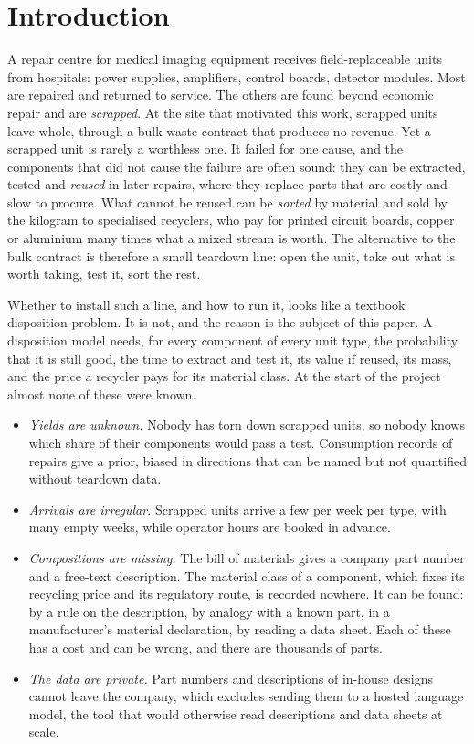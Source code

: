 \section{Introduction}\label{sec:intro}

A repair centre for medical imaging equipment receives field-replaceable units from hospitals: power supplies,
amplifiers, control boards, detector modules. Most are repaired and returned to service. The others are found beyond
economic repair and are \emph{scrapped}. At the site that motivated this work, scrapped units leave whole, through a
bulk waste contract that produces no revenue. Yet a scrapped unit is rarely a worthless one. It failed for one cause,
and the components that did not cause the failure are often sound: they can be extracted, tested and \emph{reused}
in later repairs, where they replace parts that are costly and slow to procure. What cannot be reused can be
\emph{sorted} by material and sold by the kilogram to specialised recyclers, who pay for printed circuit boards,
copper or aluminium many times what a mixed stream is worth. The alternative to the bulk contract is therefore a small
teardown line: open the unit, take out what is worth taking, test it, sort the rest.

Whether to install such a line, and how to run it, looks like a textbook disposition problem. It is not, and the
reason is the subject of this paper. A disposition model needs, for every component of every unit type, the
probability that it is still good, the time to extract and test it, its value if reused, its mass, and the price a
recycler pays for its material class. At the start of the project almost none of these were known.
\begin{itemize}
\item \emph{Yields are unknown.} Nobody has torn down scrapped units, so nobody knows which share of their components
  would pass a test. Consumption records of repairs give a prior, biased in directions that can be named but not
  quantified without teardown data.
\item \emph{Arrivals are irregular.} Scrapped units arrive a few per week per type, with many empty weeks, while
  operator hours are booked in advance.
\item \emph{Compositions are missing.} The bill of materials gives a company part number and a free-text description.
  The material class of a component, which fixes its recycling price and its regulatory route, is recorded nowhere.
  It can be found: by a rule on the description, by analogy with a known part, in a manufacturer's material
  declaration, by reading a data sheet. Each of these has a cost and can be wrong, and there are thousands of parts.
\item \emph{The data are private.} Part numbers and descriptions of in-house designs cannot leave the company, which
  excludes sending them to a hosted language model, the tool that would otherwise read descriptions and data sheets
  at scale.
\end{itemize}

